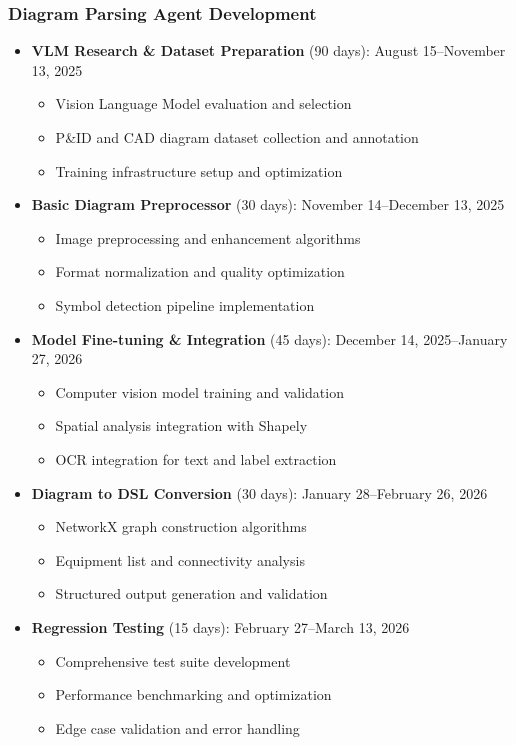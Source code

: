 \documentclass[12pt]{report}
\begin{document}
\subsubsection{Diagram Parsing Agent Development}
\begin{itemize}
  \item \textbf{VLM Research \& Dataset Preparation} (90 days): August 15--November 13, 2025
    \begin{itemize}
      \item Vision Language Model evaluation and selection
      \item P\&ID and CAD diagram dataset collection and annotation
      \item Training infrastructure setup and optimization
    \end{itemize}
  \item \textbf{Basic Diagram Preprocessor} (30 days): November 14--December 13, 2025
    \begin{itemize}
      \item Image preprocessing and enhancement algorithms
      \item Format normalization and quality optimization
      \item Symbol detection pipeline implementation
    \end{itemize}
  \item \textbf{Model Fine-tuning \& Integration} (45 days): December 14, 2025--January 27, 2026
    \begin{itemize}
      \item Computer vision model training and validation
      \item Spatial analysis integration with Shapely
      \item OCR integration for text and label extraction
    \end{itemize}
  \item \textbf{Diagram to DSL Conversion} (30 days): January 28--February 26, 2026
    \begin{itemize}
      \item NetworkX graph construction algorithms
      \item Equipment list and connectivity analysis
      \item Structured output generation and validation
    \end{itemize}
  \item \textbf{Regression Testing} (15 days): February 27--March 13, 2026
    \begin{itemize}
      \item Comprehensive test suite development
      \item Performance benchmarking and optimization
      \item Edge case validation and error handling
    \end{itemize}
\end{itemize}
\end{document}
